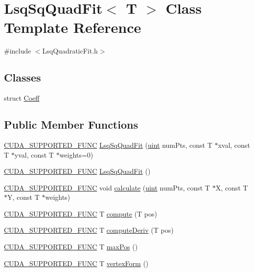 \hypertarget{class_lsq_sq_quad_fit}{}\section{Lsq\+Sq\+Quad\+Fit$<$ T $>$ Class Template Reference}
\label{class_lsq_sq_quad_fit}


{\ttfamily \#include $<$Lsq\+Quadratic\+Fit.\+h$>$}

\subsection*{Classes}
\begin{DoxyCompactItemize}
\item 
struct \hyperlink{struct_lsq_sq_quad_fit_1_1_coeff}{Coeff}
\end{DoxyCompactItemize}
\subsection*{Public Member Functions}
\begin{DoxyCompactItemize}
\item 
\hyperlink{gpu__utils_8h_a69f41cb6c15f0e34b0889a5f6d5aae32}{C\+U\+D\+A\+\_\+\+S\+U\+P\+P\+O\+R\+T\+E\+D\+\_\+\+F\+U\+NC} \hyperlink{class_lsq_sq_quad_fit_a8496ae956f841919b4dcb994c246ff81}{Lsq\+Sq\+Quad\+Fit} (\hyperlink{std__incl_8h_a91ad9478d81a7aaf2593e8d9c3d06a14}{uint} num\+Pts, const T $\ast$xval, const T $\ast$yval, const T $\ast$weights=0)
\item 
\hyperlink{gpu__utils_8h_a69f41cb6c15f0e34b0889a5f6d5aae32}{C\+U\+D\+A\+\_\+\+S\+U\+P\+P\+O\+R\+T\+E\+D\+\_\+\+F\+U\+NC} \hyperlink{class_lsq_sq_quad_fit_a8c4db85a7d3ad82338f7a25a3855b98d}{Lsq\+Sq\+Quad\+Fit} ()
\item 
\hyperlink{gpu__utils_8h_a69f41cb6c15f0e34b0889a5f6d5aae32}{C\+U\+D\+A\+\_\+\+S\+U\+P\+P\+O\+R\+T\+E\+D\+\_\+\+F\+U\+NC} void \hyperlink{class_lsq_sq_quad_fit_a4231c52feb9e5e9ea9342c3213a1d622}{calculate} (\hyperlink{std__incl_8h_a91ad9478d81a7aaf2593e8d9c3d06a14}{uint} num\+Pts, const T $\ast$X, const T $\ast$Y, const T $\ast$weights)
\item 
\hyperlink{gpu__utils_8h_a69f41cb6c15f0e34b0889a5f6d5aae32}{C\+U\+D\+A\+\_\+\+S\+U\+P\+P\+O\+R\+T\+E\+D\+\_\+\+F\+U\+NC} T \hyperlink{class_lsq_sq_quad_fit_a6aa52c07c1b7a5057f2a2cd878035d7d}{compute} (T pos)
\item 
\hyperlink{gpu__utils_8h_a69f41cb6c15f0e34b0889a5f6d5aae32}{C\+U\+D\+A\+\_\+\+S\+U\+P\+P\+O\+R\+T\+E\+D\+\_\+\+F\+U\+NC} T \hyperlink{class_lsq_sq_quad_fit_a3fe697bd9b07aa2a0b3f827a115864b5}{compute\+Deriv} (T pos)
\item 
\hyperlink{gpu__utils_8h_a69f41cb6c15f0e34b0889a5f6d5aae32}{C\+U\+D\+A\+\_\+\+S\+U\+P\+P\+O\+R\+T\+E\+D\+\_\+\+F\+U\+NC} T \hyperlink{class_lsq_sq_quad_fit_a91c3733e1e6485615966eb64e61305ae}{max\+Pos} ()
\item 
\hyperlink{gpu__utils_8h_a69f41cb6c15f0e34b0889a5f6d5aae32}{C\+U\+D\+A\+\_\+\+S\+U\+P\+P\+O\+R\+T\+E\+D\+\_\+\+F\+U\+NC} T \hyperlink{class_lsq_sq_quad_fit_a1d893652bce7f1438a4ad48e937f5405}{vertex\+Form} ()
\end{DoxyCompactItemize}

